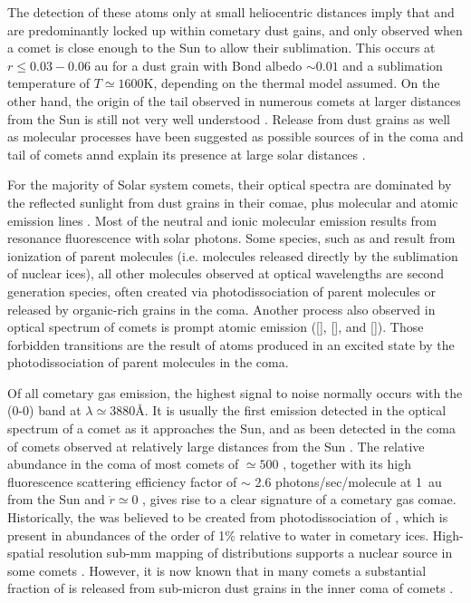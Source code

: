 \documentclass{aa}
\begin{document}
The detection of these atoms only at small heliocentric distances imply that  and  are predominantly locked up within cometary dust gains, and only observed when a comet is close enough to the Sun to allow their sublimation.
%
This occurs at $r\leq 0.03-0.06$ au for a dust grain with Bond albedo $\sim0.01$ and a sublimation temperature of $T\simeq 1600$K, depending on the thermal model assumed.
%
On the other hand, the origin of the  tail observed in numerous comets at larger distances from the Sun is still not very well understood \citep{Cremonese02}.
%
Release from dust grains as well as molecular processes have been suggested as possible sources of  in the coma and tail of comets annd explain its presence at large solar distances \citep{Cremonese1997}.

For the majority of Solar system comets, their optical spectra are dominated by the reflected sunlight from dust grains in their comae, plus molecular and atomic emission lines \citep[e.g. ][]{hyland2019}.
%
Most of the neutral and ionic molecular emission results from resonance fluorescence with solar photons. Some species, such as  and  result from ionization of parent molecules (i.e. molecules released directly by the sublimation of nuclear ices), all other molecules observed at optical wavelengths are second generation species, often created via photodissociation of parent molecules or released by organic-rich grains in the coma.
%
Another process also observed in optical spectrum of comets is prompt atomic emission  ([], [], and []).
%
Those forbidden transitions are the result of atoms produced in an excited state by the photodissociation of parent molecules in the coma. 

Of all cometary gas emission, the highest signal to noise normally occurs with the  (0-0) band at $\lambda\simeq 3880$\AA.
%
It is usually the first emission detected in the optical spectrum of a comet as it approaches the Sun, and as been detected in the coma of comets observed at relatively large distances from the Sun \citep[e.g. ][]{Fitzsimmons1996}.
%
The relative abundance in the coma of most comets of $\simeq500$ \citep{AHearn1995}, together with its high fluorescence scattering efficiency factor of $\sim$ 2.6 photons/sec/molecule at 1~au from the Sun and $\dot{r}\simeq 0$ \citep{Schleicher2010}, gives rise to a clear signature of a cometary gas comae.
%
Historically, the  was believed to be created from photodissociation of , which is present in abundances of the order of 1\% relative to water in cometary ices.
%
High-spatial resolution sub-mm mapping of  distributions supports a nuclear source in some comets \citep{Cordiner2014}.
%
However, it is now known that in many comets a substantial fraction of  is released from sub-micron dust grains in the inner coma of comets \citep[e.g. ][]{Fray2005}. 
\end{document}
